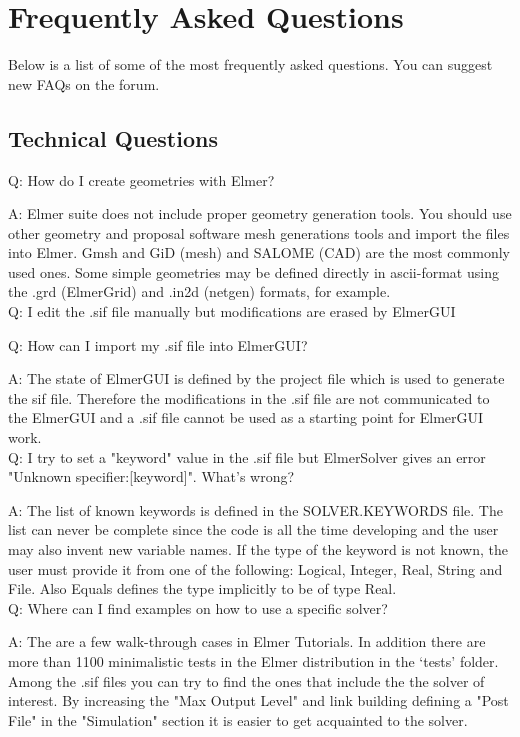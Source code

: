 \section{Frequently Asked Questions}

Below is a list of some of the most frequently asked questions. You can suggest new FAQs on the forum.

\subsection{Technical Questions}

    Q: How do I create geometries with Elmer?

    A: Elmer suite does not include proper geometry generation tools. You should use other geometry and proposal software mesh generations tools and import the files into Elmer. Gmsh and GiD (mesh) and SALOME (CAD) are the most commonly used ones. Some simple geometries may be defined directly in ascii-format using the .grd (ElmerGrid) and .in2d (netgen) formats, for example.\\

    Q: I edit the .sif file manually but modifications are erased by ElmerGUI

    Q: How can I import my .sif file into ElmerGUI?

    A: The state of ElmerGUI is defined by the project file which is used to generate the sif file. Therefore the modifications in the .sif file are not communicated to the ElmerGUI and a .sif file cannot be used as a starting point for ElmerGUI work.\\

    Q: I try to set a "keyword" value in the .sif file but ElmerSolver gives an error "Unknown specifier:[keyword]". What's wrong?

    A: The list of known keywords is defined in the SOLVER.KEYWORDS file. The list can never be complete since the code is all the time developing and the user may also invent new variable names. If the type of the keyword is not known, the user must provide it from one of the following: Logical, Integer, Real, String and File. Also Equals defines the type implicitly to be of type Real.\\

    Q: Where can I find examples on how to use a specific solver?

    A: The are a few walk-through cases in Elmer Tutorials. In addition there are more than 1100 minimalistic tests in the Elmer distribution in the `tests' folder.  Among the .sif files you can try to find the ones that include the the solver of interest. By increasing the "Max Output Level" and link building defining a "Post File" in the "Simulation" section it is easier to get acquainted to the solver.\\

